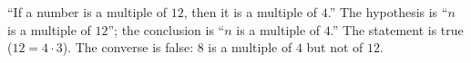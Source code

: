 ``If a number is a multiple of $12$, then it is a multiple of $4$.'' The hypothesis is ``$n$ is a multiple of $12$''; the conclusion is ``$n$ is a multiple of $4$.'' The statement is true ($12=4\cdot3$). The converse is false: $8$ is a multiple of $4$ but not of $12$.
